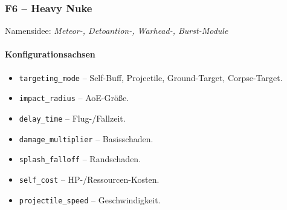 \subsubsection{F6 – Heavy Nuke}
Namensidee: \emph{Meteor-, Detoantion-, Warhead-, Burst-Module}

\paragraph{Konfigurationsachsen}{}

\begin{itemize}
	\item \texttt{targeting\_mode} – Self-Buff, Projectile, Ground-Target, Corpse-Target.
	\item \texttt{impact\_radius} – AoE-Größe.
	\item \texttt{delay\_time} – Flug-/Fallzeit.
	\item \texttt{damage\_multiplier} – Basisschaden.
	\item \texttt{splash\_falloff} – Randschaden.
	\item \texttt{self\_cost} – HP-/Ressourcen-Kosten.
	\item \texttt{projectile\_speed} – Geschwindigkeit.
\end{itemize}

